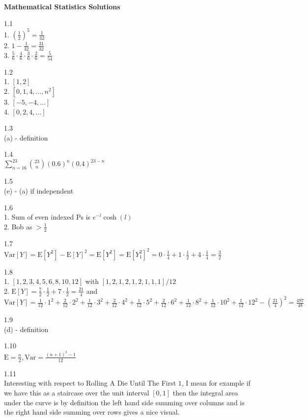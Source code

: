 \Large

\textbf{Mathematical Statistics Solutions}

1.1 \\
1. $\left( \frac{1}{2} \right)^5=\frac{1}{32}$ \\
2. $1-\frac{1}{32}=\frac{31}{32}$ \\
3. $\frac{5}{6} \cdot \frac{4}{6} \cdot \frac{3}{6} \cdot \frac{2}{6} = \frac{5}{54}$

1.2 \\
1. $[1,2]$ \\
2. $[0,1,4,\dots,n^2]$ \\
3. $[-5,-4,\dots]$ \\
4. $[0,2,4,\dots]$

1.3 \\
(a) - definition

1.4 \\
$\sum_{n=16}^{23} \binom{23}{n} (0.6)^n (0.4)^{23-n}$

1.5 \\
(e) - (a) if independent

1.6 \\
1. Sum of even indexed $\text{P}$s is $e^{-l} \cosh(l)$ \\
2. Bob as $>\frac{1}{2}$

1.7 \\
$\text{Var}[Y]=\text{E}[Y^2]-\text{E}[Y]^2=\text{E}[Y^2]=\text{E}[Y_1^2]^2=0 \cdot \frac{1}{4} + 1 \cdot \frac{1}{2} + 4 \cdot \frac{1}{4} = \frac{3}{2}$

1.8 \\
1. $[1,2,3,4,5,6,8,10,12]$ with $[1,2,1,2,1,2,1,1,1]/12$ \\
2. $\text{E}[Y] = \frac{7}{2} \cdot \frac{1}{2} + 7 \cdot \frac{1}{2} = \frac{21}{4}$ and $\text{Var}[Y]=\frac{1}{12} \cdot 1^2 + \frac{2}{12} \cdot 2^2 + \frac{1}{12} \cdot 3^2 + \frac{2}{12} \cdot 4^2 + \frac{1}{12} \cdot 5^2 + \frac{2}{12} \cdot 6^2 + \frac{1}{12} \cdot 8^2 + \frac{1}{12} \cdot 10^2 + \frac{1}{12} \cdot 12^2 - \left( \frac{21}{4} \right)^2 = \frac{497}{48}$

1.9 \\
(d) - definition

1.10 \\
$\text{E}=\frac{n}{2},\text{Var}=\frac{(n+1)^2-1}{12}$

1.11 \\
Interesting with respect to Rolling A Die Until The First $1$, I mean for example if we have this as a staircase over the unit interval $[0,1]$ then the integral area under the curve is by definition the left hand side summing over columns and is the right hand side summing over rows gives a nice visual.

